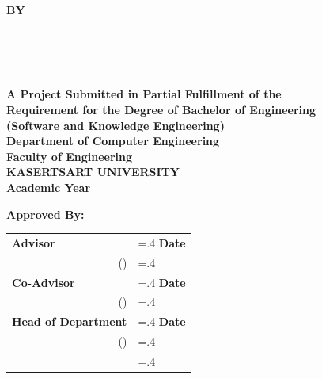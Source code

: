 \thispagestyle{empty}
\begin{center}
    {\huge\textbf{\usevar{\srsTitle}}}\vspace{1in}

    {\huge\textbf{BY}}\vspace{.5in}

    {\huge\textbf{%
        \usevar{\srsAuthorOne} \\
        \usevar{\srsAuthorTwo} \\
        \usevar{\srsAuthorThree} \\
    }}\vfill

    {\large\textbf{%
        A Project Submitted in Partial Fulfillment of the\\
        Requirement for the Degree of Bachelor of Engineering\\
        (Software and Knowledge Engineering)\\
        Department of Computer Engineering\\
        Faculty of Engineering\\
        KASERTSART UNIVERSITY\\
        Academic Year \usevar{\srsAcademicYear}\\
    }}
\end{center}

\vspace{.5in}

{\large\textbf{Approved By:}}\vspace{.2in}

\begin{tabularx}{1\textwidth}{X >{\hsize=.4\hsize}X}
    \textbf{Advisor}\dotfill & \textbf{Date}\dotfill \\
    \multicolumn{1}{r}{(\usevar{\srsAdvisorName})} & \\[.1in]

\iffalse
    \ifx\srsCoAdvisorName\empty
    \else
    \textbf{Co-Advisor}\dotfill & \textbf{Date}\dotfill \\
    \multicolumn{1}{r}{(\usevar{\srsCoAdvisorName})} & \\[.1in]
    \fi

    \textbf{Head of Department}\dotfill & \textbf{Date}\dotfill \\
    \multicolumn{1}{r}{(\usevar{\srsHoDName})} & \\
\fi
\end{tabularx}

\restoregeometry